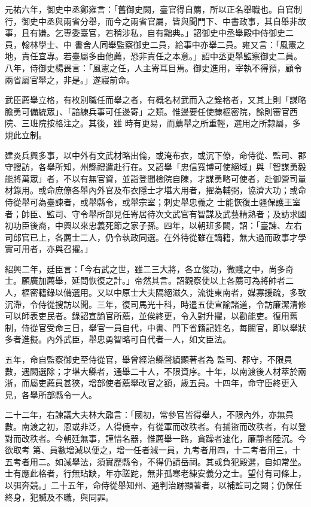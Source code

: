 \begin{pinyinscope}
 元祐六年，御史中丞鄭雍言：「舊御史闕，臺官得自薦，所以正名舉職也。自官制行，御史中丞與兩省分舉，而今之兩省官屬，皆與聞門下、中書政事，其自舉非故事，且有嫌。乞專委臺官，若稍涉私，自有黜典。」詔御史中丞舉殿中侍御史二員，翰林學士、中
 書舍人同舉監察御史二員，給事中亦舉二員。雍又言：「風憲之地，責任宜專。若臺屬多由他薦，恐非責任之本意。」詔中丞更舉監察御史二員。八年，侍御史楊畏言：「風憲之任，人主寄耳目焉。御史進用，宰執不得預，顧令兩省屬官舉之，非是。」遂寢前命。



 武臣薦舉立格，有枚別職任而舉之者，有概名材武而入之銓格者，又其上則「謀略膽勇可備統眾」、「諳練兵事可任邊寄」之類。惟邊要任使隸樞密院，餘則審官西院、三班院按格注之。其後，雖
 時有更易，而薦舉之所重輕，選用之所隸屬，多規此立制。



 建炎兵興多事，以中外有文武材略出倫，或淹布衣，或沉下僚，命侍從、監司、郡守搜訪，各舉所知，州縣禮遣赴行在。又詔舉「忠信寬博可使絕域」與「智謀勇毅能將萬眾」者，不以有無官資，並詣登聞檢院自陳，才謀勇略可使者，赴御營司量材錄用。或命庶僚各舉內外官及布衣隱士才堪大用者，擢為輔弼，協濟大功；或命侍從舉可為臺諫者，或舉縣令，或舉宗室；刺史舉忠義之
 士能恢復土疆保護王室者；帥臣、監司、守令舉所部見任寄居待次文武官有智謀及武藝精熟者；及訪求國初功臣後裔，中興以來忠義死節之家子孫。四年，以朝班多闕，詔：「臺諫、左右司郎官已上，各薦士二人，仍令執政同選。在外待從雖在謫籍，無大過而政事才學實可用者，亦與召擢。」



 紹興二年，廷臣言：「今右武之世，雖二三大將，各立俊功，微賤之中，尚多奇士。願廣加薦舉，延問恢復之計。」帝然其言。詔觀察使以上各薦可為將帥者二
 人，樞密籍錄以備選用。又以中原士大夫隔絕滋久，流徙東南者，媒寡援疏，多致沉滯，令侍從搜訪以聞。三年，復司馬光十科，時遣五使宣諭諸道，令訪廉潔清修可以師表吏民者。錄詔宣諭官所薦，並俟終更，令入對升擢，以勸能吏。復用舊制，侍從官受命三日，舉官一員自代，中書、門下省籍記姓名，每闕官，即以舉狀多者進擬。內外武臣，舉忠勇智略可自代者一人，如文臣法。



 五年，命自監察御史至侍從官，舉曾經治縣聲績顯著者為
 監司、郡守，不限員數，遇闕選除；才堪大縣者，通舉二十人，不限資序。十年，以南渡後人材萃於兩浙，而屬吏薦員甚狹，增部使者薦舉改官之額，歲五員。十四年，命守臣終更入見，各舉所部縣令一人。



 二十二年，右諫議大夫林大鼐言：「國初，常參官皆得舉人，不限內外，亦無員數。南渡之初，恩或非泛，人得僥幸，有從軍而改秩者。有捕盜而改秩者，有以登對而改秩者。今朝廷無事，謹惜名器，惟薦舉一路，貪躁者速化，廉靜者陸沉。今欲取考
 第、員數增減以便之，增一任者減一員，九考者用四，十二考者用三，十五考者用二。如減舉法，須實歷縣令，不得仍請岳祠。其或負犯殿選，自如常坐。士有應此格者，行無玷缺，年亦蹉跎，無非孤寒老練安義分之士。望付有司條上，以弭奔競。」二十五年，命侍從舉知州、通判治跡顯著者，以補監司之闕；仍保任終身，犯贓及不職，與同罪。




\end{pinyinscope}
